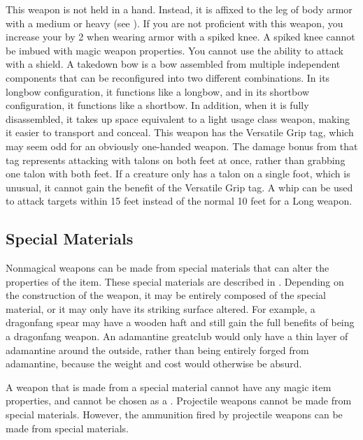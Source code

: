          This weapon is not held in a hand.
        Instead, it is affixed to the leg of body armor with a medium or heavy  (see ).
        If you are not proficient with this weapon, you increase your  by 2 when wearing armor with a spiked knee.
        A spiked knee cannot be imbued with magic weapon properties.
         You cannot use the  ability to attack with a shield.
         A takedown bow is a bow assembled from multiple independent components that can be reconfigured into two different combinations.
        In its longbow configuration, it functions like a longbow, and in its shortbow configuration, it functions like a shortbow.
        In addition, when it is fully disassembled, it takes up space equivalent to a light usage class weapon, making it easier to transport and conceal.
         This weapon has the Versatile Grip tag, which may seem odd for an obviously one-handed weapon.
        The damage bonus from that tag represents attacking with talons on both feet at once, rather than grabbing one talon with both feet.
        If a creature only has a talon on a single foot, which is unusual, it cannot gain the benefit of the Versatile Grip tag.
         A whip can be used to attack targets within 15 feet instead of the normal 10 feet for a Long weapon.

    \subsection{Special Materials}\label{Special Materials}
        Nonmagical weapons can be made from special materials that can alter the properties of the item.
        These special materials are described in .
        Depending on the construction of the weapon, it may be entirely composed of the special material, or it may only have its striking surface altered.
        For example, a dragonfang spear may have a wooden haft and still gain the full benefits of being a dragonfang weapon.
        An adamantine greatclub would only have a thin layer of adamantine around the outside, rather than being entirely forged from adamantine, because the weight and cost would otherwise be absurd.

        A weapon that is made from a special material cannot have any magic item properties, and cannot be chosen as a .
        Projectile weapons cannot be made from special materials.
        However, the ammunition fired by projectile weapons can be made from special materials.

